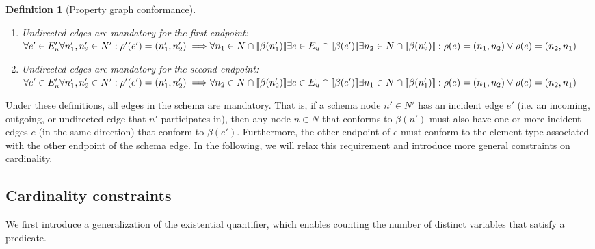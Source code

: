 \documentclass[a4paper]{article}
\newtheorem{definition}[theorem]{Definition}
\newcommand{\lsem}{\ensuremath{[\![}}
\newcommand{\rsem}{\ensuremath{]\!]}}
\newcommand{\sem}[1]{\ensuremath{\lsem #1 \rsem}}
\begin{document}
\begin{definition}[Property graph conformance]
\begin{enumerate}
    \item Undirected edges are mandatory for the first endpoint:\\
    $\forall e' \in E_u' \forall n'_1, n'_2 \in N' : \rho'(e') = (n'_1, n'_2) \implies
    \\\forall n_1 \in N \cap \sem{\beta(n'_1)} \exists e \in E_u \cap \sem{\beta(e')} \exists n_2 \in N \cap \sem{\beta(n'_2)} : \rho(e) = (n_1, n_2) \vee \rho(e) = (n_2, n_1)$

    \item Undirected edges are mandatory for the second endpoint:\\
    $\forall e' \in E_u' \forall n'_1, n'_2 \in N' : \rho'(e') = (n'_1, n'_2) \implies
    \\\forall n_2 \in N \cap \sem{\beta(n'_2)} \exists e \in E_u \cap \sem{\beta(e')} \exists n_1 \in N \cap \sem{\beta(n'_1)} : \rho(e) = (n_1, n_2) \vee \rho(e) = (n_2, n_1)$
  \end{enumerate}
\end{definition}


Under these definitions, all edges in the schema are mandatory. That is, if a schema node $n' \in N'$ has an incident edge $e'$ (i.e. an incoming, outgoing, or undirected edge that $n'$ participates in), then any node $n \in N$ that conforms to $\beta(n')$ must also have one or more incident edges $e$ (in the same direction) that conform to $\beta(e')$. Furthermore, the other endpoint of $e$ must conform to the element type associated with the other endpoint of the schema edge. In the following, we will relax this requirement and introduce more general constraints on cardinality.

\subsection{Cardinality constraints}

We first introduce a generalization of the existential quantifier, which enables counting the number of distinct variables that satisfy a predicate.
\end{document}
